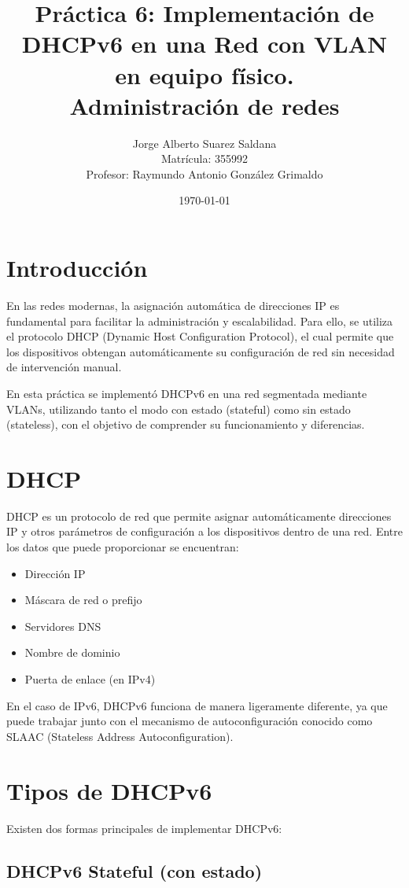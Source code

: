 \documentclass[12pt]{article}
\title{
Práctica 6: Implementación de DHCPv6 en una Red con VLAN en equipo físico.\\[0.5em]
\large Administración de redes
}
\author{
Jorge Alberto Suarez Saldana\\
\small Matrícula: 355992\\
Profesor: Raymundo Antonio González Grimaldo
}
\date{\today}
\begin{document}
\maketitle

\section{Introducción}

En las redes modernas, la asignación automática de direcciones IP es fundamental para facilitar la administración y escalabilidad. 
Para ello, se utiliza el protocolo DHCP (Dynamic Host Configuration Protocol), el cual permite que los dispositivos obtengan automáticamente su configuración de 
red sin necesidad de intervención manual.

En esta práctica se implementó DHCPv6 en una red segmentada mediante VLANs, utilizando tanto el modo con estado (stateful) como sin estado (stateless), con el objetivo 
de comprender su funcionamiento y diferencias.

\section{DHCP}

DHCP es un protocolo de red que permite asignar automáticamente direcciones IP y otros parámetros de configuración a los dispositivos dentro de una red. Entre los 
datos que puede proporcionar se encuentran:

\begin{itemize}
    \item Dirección IP
    \item Máscara de red o prefijo
    \item Servidores DNS
    \item Nombre de dominio
    \item Puerta de enlace (en IPv4)
\end{itemize}

En el caso de IPv6, DHCPv6 funciona de manera ligeramente diferente, ya que puede trabajar junto con el mecanismo de autoconfiguración conocido como SLAAC 
(Stateless Address Autoconfiguration).

\section{Tipos de DHCPv6}

Existen dos formas principales de implementar DHCPv6:

\subsection{DHCPv6 Stateful (con estado)}
\end{document}
